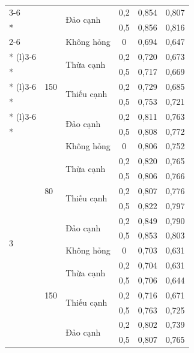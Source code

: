 {\begin{longtable}{lllccc}
\cmidrule(l){3-6}
 &  & \multirow{2}{*}{Đảo cạnh} & 0,2 & 0,854 & 0,807 \\*
 &  &  & 0,5 & 0,856 & 0,816 \\
\cmidrule(l){2-6}
 & \multirow{7}{*}{150} & \multirow{1}{*}{Không hỏng} & 0 & 0,694 & 0,647 \\*
\cmidrule(l){3-6}
 &  & \multirow{2}{*}{Thừa cạnh} & 0,2 & 0,720 & 0,673 \\*
 &  &  & 0,5 & 0,717 & 0,669 \\*
\cmidrule(l){3-6}
 &  & \multirow{2}{*}{Thiếu cạnh} & 0,2 & 0,729 & 0,685 \\*
 &  &  & 0,5 & 0,753 & 0,721 \\*
\cmidrule(l){3-6}
 &  & \multirow{2}{*}{Đảo cạnh} & 0,2 & 0,811 & 0,763 \\*
 &  &  & 0,5 & 0,808 & 0,772 \\
\midrule
\multirow{14}{*}{3} & \multirow{7}{*}{80} & \multirow{1}{*}{Không hỏng} & 0 & 0,806 & 0,752 \\*
\cmidrule(l){3-6}
 &  & \multirow{2}{*}{Thừa cạnh} & 0,2 & 0,820 & 0,765 \\*
 &  &  & 0,5 & 0,806 & 0,766 \\*
\cmidrule(l){3-6}
 &  & \multirow{2}{*}{Thiếu cạnh} & 0,2 & 0,807 & 0,776 \\*
 &  &  & 0,5 & 0,822 & 0,797 \\*
\cmidrule(l){3-6}
 &  & \multirow{2}{*}{Đảo cạnh} & 0,2 & 0,849 & 0,790 \\*
 &  &  & 0,5 & 0,853 & 0,803 \\
\cmidrule(l){2-6}
 & \multirow{7}{*}{150} & \multirow{1}{*}{Không hỏng} & 0 & 0,703 & 0,631 \\*
\cmidrule(l){3-6}
 &  & \multirow{2}{*}{Thừa cạnh} & 0,2 & 0,704 & 0,631 \\*
 &  &  & 0,5 & 0,706 & 0,644 \\*
\cmidrule(l){3-6}
 &  & \multirow{2}{*}{Thiếu cạnh} & 0,2 & 0,716 & 0,671 \\*
 &  &  & 0,5 & 0,763 & 0,725 \\*
\cmidrule(l){3-6}
 &  & \multirow{2}{*}{Đảo cạnh} & 0,2 & 0,802 & 0,739 \\*
 &  &  & 0,5 & 0,807 & 0,765 \\
\end{longtable}
}
